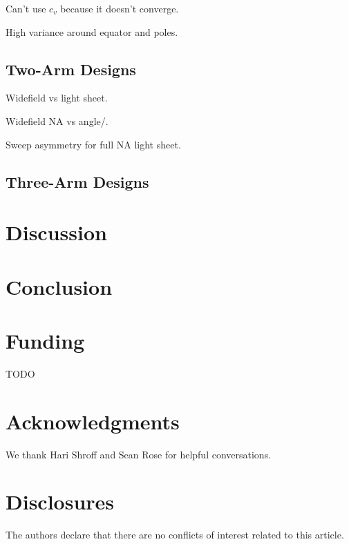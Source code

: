 \documentclass[10pt]{article}
\begin{document}
Can't use $c_v$ because it doesn't converge.

High variance around equator and poles. 

\subsection{Two-Arm Designs}
Widefield vs light sheet.

Widefield NA vs angle/.

Sweep asymmetry for full NA light sheet.



\subsection{Three-Arm Designs}

\section{Discussion}

\section{Conclusion}

\section*{Funding}
TODO

\section*{Acknowledgments}
We thank Hari Shroff and Sean Rose for helpful conversations. 

\section*{Disclosures}
The authors declare that there are no conflicts of interest related to this article.
\end{document}
